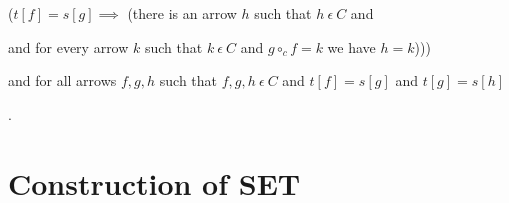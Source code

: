 \documentclass{article}
\newcommand{\mcirc}{\circ_{c}}
\newcommand{\inn}{~\epsilon~}
\newcommand{\innn}{~\epsilon~} %
\begin{document}
\begin{forthel}
\begin{definition}
			($t[f]=s[g] \implies$ (there is an arrow $h$ such that $h \inn C$ and 

			\begin{center}
			\end{center}						
			
			and for every arrow $k$ such that $k \inn C$ and $g \mcirc f = k$ we have $h=k$)))
			
			and for all arrows $f,g,h$ such that $f,g,h \inn C$ and $t[f]=s[g]$ and $t[g]=s[h]$
			\begin{center}
					.
			\end{center}
		                      		 
		\end{definition}
		

	\end{forthel}
	
	\section{Construction of SET}
	
	\begin{comment}
	\begin{forthel}
	
	Let $f \innn C$ stand for ($f$ is an arrow such that $f \inn C$).
	
	\end{forthel}
	\end{comment}
	
\end{document}

